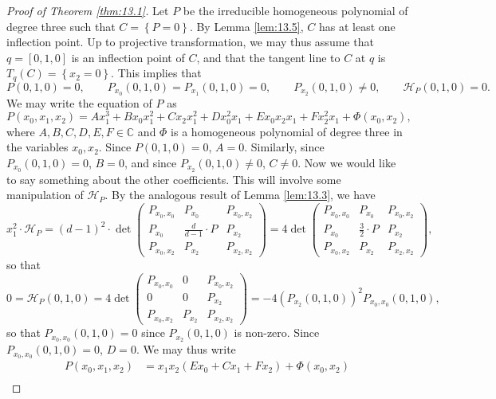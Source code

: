\documentclass{article}
\newcommand{\C}{\mathbb{C}}
\newcommand{\rb}[1]{\left( #1 \right)}
\renewcommand{\sb}[1]{\left[ #1 \right]}
\newcommand{\cb}[1]{\left\{ #1 \right\}}
\theoremstyle{definition}\newtheorem{definition}{Definition}[section]
\theoremstyle{definition}\newtheorem{notation}[definition]{Notation}
\theoremstyle{definition}\newtheorem{remark}[definition]{Remark}
\theoremstyle{definition}\newtheorem{example}[definition]{Example}
\theoremstyle{definition}\newtheorem{fact}{Fact}
\theoremstyle{definition}\newtheorem{exercise}{Exercise}
\begin{document}
\begin{proof}[Proof of Theorem \ref{thm:13.1}]
Let $ P $ be the irreducible homogeneous polynomial of degree three such that $ C = \cb{P = 0} $. By Lemma \ref{lem:13.5}, $ C $ has at least one inflection point. Up to projective transformation, we may thus assume that $ q = \sb{0, 1, 0} $ is an inflection point of $ C $, and that the tangent line to $ C $ at $ q $ is $ T_q\rb{C} = \cb{x_2 = 0} $. This implies that
$$ P\rb{0, 1, 0} = 0, \qquad P_{x_0}\rb{0, 1, 0} = P_{x_1}\rb{0, 1, 0} = 0, \qquad P_{x_2}\rb{0, 1, 0} \ne 0, \qquad \mathcal{H}_P\rb{0, 1, 0} = 0. $$
We may write the equation of $ P $ as
$$ P\rb{x_0, x_1, x_2} = Ax_1^3 + Bx_0x_1^2 + Cx_2x_1^2 + Dx_0^2x_1 + Ex_0x_2x_1 + Fx_2^2x_1 + \Phi\rb{x_0, x_2}, $$
where $ A, B, C, D, E, F \in \C $ and $ \Phi $ is a homogeneous polynomial of degree three in the variables $ x_0, x_2 $. Since $ P\rb{0, 1, 0} = 0 $, $ A = 0 $. Similarly, since $ P_{x_0}\rb{0, 1, 0} = 0 $, $ B = 0 $, and since $ P_{x_2}\rb{0, 1, 0} \ne 0 $, $ C \ne 0 $. Now we would like to say something about the other coefficients. This will involve some manipulation of $ \mathcal{H}_P $. By the analogous result of Lemma \ref{lem:13.3}, we have
$$ x_1^2 \cdot \mathcal{H}_P = \rb{d - 1}^2 \cdot \det\begin{pmatrix} P_{x_0, x_0} & P_{x_0} & P_{x_0, x_2} \\ P_{x_0} & \tfrac{d}{d - 1} \cdot P & P_{x_2} \\ P_{x_0, x_2} & P_{x_2} & P_{x_2, x_2} \end{pmatrix} = 4\det\begin{pmatrix} P_{x_0, x_0} & P_{x_0} & P_{x_0, x_2} \\ P_{x_0} & \tfrac{3}{2} \cdot P & P_{x_2} \\ P_{x_0, x_2} & P_{x_2} & P_{x_2, x_2} \end{pmatrix}, $$
so that
$$ 0 = \mathcal{H}_P\rb{0, 1, 0} = 4\det\begin{pmatrix} P_{x_0, x_0} & 0 & P_{x_0, x_2} \\ 0 & 0 & P_{x_2} \\ P_{x_0, x_2} & P_{x_2} & P_{x_2, x_2} \end{pmatrix} = -4\rb{P_{x_2}\rb{0, 1, 0}}^2P_{x_0, x_0}\rb{0, 1, 0}, $$
so that $ P_{x_0, x_0}\rb{0, 1, 0} = 0 $ since $ P_{x_2}\rb{0, 1, 0} $ is non-zero. Since $ P_{x_0, x_0}\rb{0, 1, 0} = 0 $, $ D = 0 $. We may thus write
\begin{align*}
P\rb{x_0, x_1, x_2}
& = x_1x_2\rb{Ex_0 + Cx_1 + Fx_2} + \Phi\rb{x_0, x_2} \\

\end{align*}
\end{proof}
\end{document}
